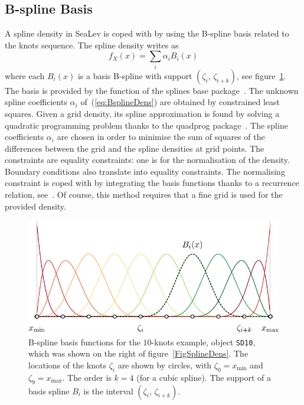 \documentclass[11pt,a4paper]{report}\usepackage[]{graphicx}\usepackage[]{color}
\newcommand{\pkg}[1]{{\fontseries{b}\selectfont #1}}
\newcommand{\Low}[1]{#1_{\mathrm{min}}}
\newcommand{\Up}[1]{#1_{\mathrm{max}}}
\begin{document}
\subsection{B-spline Basis}
A spline density in \pkg{SeaLev} is coped with by using the B-spline
basis related to the knots sequence. The spline density writes as  
\begin{equation}
  \label{eq:BsplineDens}
  f_X(x) = \sum_i \alpha_i B_i(x)
\end{equation}
where each $B_i(x)$ is a basis B-spline with support
$(\zeta_i,\,\zeta_{i+k})$, see figure~\ref{FigBspline}.  The basis is
provided by the \verb@splineDesign@ function of the \pkg{splines} base
package~\cite{RMANUAL}. The unknown spline coefficients $\alpha_i$ 
of~(\ref{eq:BsplineDens}) are
obtained by constrained least squares. Given a grid density, its spline
approximation is found by solving a quadratic programming problem
thanks to the \pkg{quadprog} package~\cite{PACKquadprog}. The spline
coefficients $\alpha_i$ are chosen in order to minimise the sum of squares of the
differences between the grid and the spline densities at grid
points. The constraints are equality constraints: one is for the
normalisation of the density. Boundary conditions also translate
into equality constraints. The normalising constraint is
coped with by integrating the basis functions thanks to a recurrence
relation, see~\cite[p.~128]{deBoor}.
Of course, this method requires that a fine
grid is used for the provided density.



\begin{figure}
  \centering
  \includegraphics[width=12cm]{./figures/figure/Bspline.pdf}
  \caption{\label{FigBspline} B-spline basis functions for the
    $10$-knots example, object \texttt{SD10}, which was shown on the
    right of figure~\ref{FigSplineDens}. The locations of the knots
    $\zeta_i$ are shown by circles, with $\zeta_0 = \Low{x}$ and $\zeta_9 =
    \Up{x}$. The order is $k = 4$ (for a cubic spline). The support of
    a basis spline $B_i$ is the interval $(\zeta_i,\,\zeta_{i+k})$.  }
\end{figure}
\end{document}
